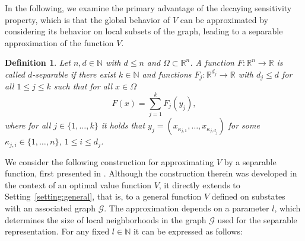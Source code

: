 \documentclass{article}
\def\N{\mathbb{N}}
\newcommand{\R}{\mathbb{R}}
\newcommand{\Rn}{\R^n}
\newtheorem{definition}{Definition}[section]
\begin{document}
In the following, we examine the primary advantage of the decaying sensitivity property, which is that the global behavior of $V$ can be approximated by considering its behavior on local subsets of the graph, leading to a separable approximation of the function $V$.
\begin{definition} \label{def:separable}
Let $n, d \in \N$ with $d \leq n$ and $\Omega \subset \Rn$. A function $F \colon \Rn \to \R$ is called $d$-separable if there exist $k \in \N$ and functions $F_j \colon \R^{d_j} \to \R$ with $d_j \leq d$ for all $1 \leq j \leq k$ such that for all $x \in \Omega$ 
\begin{equation*}
    F(x) =  \sum_{j=1}^k F_j(y_j),
\end{equation*}
where for all $j \in \{ 1, \dots, k \}$ it holds that $y_j = (x_{\kappa_{j,1}}, \dots, x_{\kappa_{j,d_j}})$ for some $\kappa_{j,i} \in \{ 1, \dots, n \}$, $1 \leq i \leq d_j$.
\end{definition}

We consider the following construction for approximating $V$ by a separable function, first presented in \cite{sperl2023separable}. Although the construction therein was developed in the context of an optimal value function $V$, it directly extends to Setting~\ref{setting:general}, that is, to a general function $V$ defined on substates with an associated graph $\mathcal{G}$. The approximation depends on a parameter $l$, which determines the size of local neighborhoods in the graph $\mathcal{G}$ used for the separable representation. For any fixed $l \in \N$ it can be expressed as follows:
\end{document}
